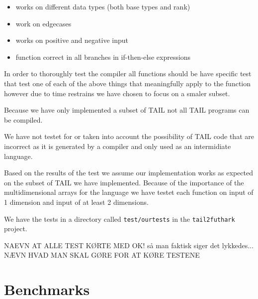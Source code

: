 \documentclass[11pt]{article}
\begin{document}
\begin{itemize}
\item works on different data types (both base types and rank)
\item work on edgecases
\item works on positive and negative input
\item function correct in all branches in if-then-else expressions
\end{itemize}
In order to thoroughly test the compiler all functions should be have specific test that test one of each of the above things
that meaningfully apply to the function however due to time restrains we have chosen to focus on a smaler subset. 

Because we have only implemented a subset of TAIL not all TAIL programs can be compiled. 


We have not testet for or taken into account the possibility of TAIL code that are incorrect as it is generated by a compiler and only used as an intermidiate language. 

Based on the results of the test we assume our implementation works as expected on the subset of TAIL we have implemented. 
Because of the importance of the multidimensional arrays for the language we have testet each function on input of 1 dimension and input of at least 2 dimensions. 


We have the tests in a directory called {\tt test/ourtests} in the {\tt tail2futhark} project. 


NAEVN AT ALLE TEST KØRTE MED OK! så man faktisk siger det lykkedes...
NÆVN HVAD MAN SKAL GØRE FOR AT KØRE TESTENE

\section{Benchmarks}
\label{sec:benchmarks}
\end{document}
